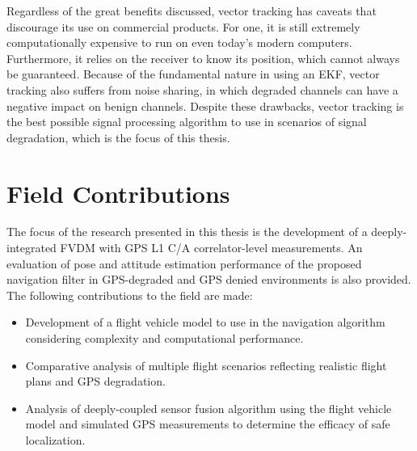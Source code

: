 Regardless of the great benefits discussed, vector tracking has caveats that discourage its use on commercial products. For one, it is still extremely computationally expensive to run on even today's modern computers. Furthermore, it relies on the receiver to know its position, which cannot always be guaranteed. Because of the fundamental nature in using an EKF, vector tracking also suffers from noise sharing, in which degraded channels can have a negative impact on benign channels. Despite these drawbacks, vector tracking is the best possible signal processing algorithm to use in scenarios of signal degradation, which is the focus of this thesis.

\section{\textbf{Field Contributions}}
The focus of the research presented in this thesis is the development of a deeply-integrated FVDM with GPS L1 C/A correlator-level measurements. An evaluation of pose and attitude estimation performance of the proposed navigation filter in GPS-degraded and GPS denied environments is also provided. The following contributions to the field are made:
\begin{itemize}
    \item Development of a flight vehicle model to use in the navigation algorithm considering complexity and computational performance.
    \item Comparative analysis of multiple flight scenarios reflecting realistic flight plans and GPS degradation.
    \item Analysis of deeply-coupled sensor fusion algorithm using the flight vehicle model and simulated GPS measurements to determine the efficacy of safe localization.
\end{itemize}

